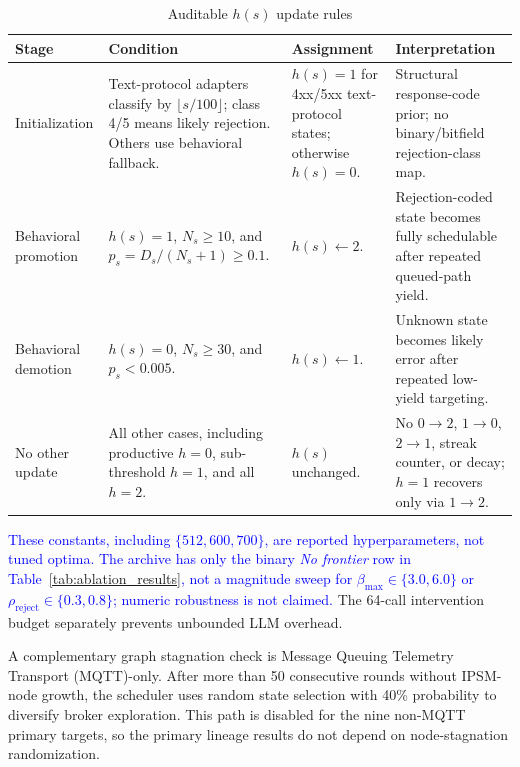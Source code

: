 \documentclass[final,5p,times,number]{elsarticle}
\begin{document}
\begin{table}[!t]
\centering
\caption{Auditable $h(s)$ update rules}
\label{tab:error_hint_update}
{\scriptsize
\setlength{\tabcolsep}{4.0pt}
\renewcommand{\arraystretch}{1.08}
\begin{tabularx}{\textwidth}{p{} p{} p{} X}
\toprule
Stage & Condition & Assignment & Interpretation \\
\midrule
Initialization &
Text-protocol adapters classify by $\lfloor s/100\rfloor$; class 4/5 means likely rejection. Others use behavioral fallback. &
$h(s)=1$ for 4xx/5xx text-protocol states; otherwise $h(s)=0$. &
Structural response-code prior; no binary/bitfield rejection-class map. \\
\midrule
Behavioral promotion &
$h(s)=1$, $N_s\ge10$, and $p_s=D_s/(N_s+1)\ge0.1$. &
$h(s)\leftarrow2$. &
Rejection-coded state becomes fully schedulable after repeated queued-path yield. \\
\midrule
Behavioral demotion &
$h(s)=0$, $N_s\ge30$, and $p_s<0.005$. &
$h(s)\leftarrow1$. &
Unknown state becomes likely error after repeated low-yield targeting. \\
\midrule
No other update &
All other cases, including productive $h=0$, sub-threshold $h=1$, and all $h=2$. &
$h(s)$ unchanged. &
No $0\!\rightarrow\!2$, $1\!\rightarrow\!0$, $2\!\rightarrow\!1$, streak counter, or decay; $h=1$ recovers only via $1\!\rightarrow\!2$. \\
\bottomrule
\end{tabularx}
}
\end{table}

\textcolor{blue}{These constants, including $\{512,600,700\}$, are reported hyperparameters, not tuned optima. The archive has only the binary \emph{No frontier} row in Table~\ref{tab:ablation_results}, not a magnitude sweep for $\beta_{\max}\in\{3.0,6.0\}$ or $\rho_{\mathrm{reject}}\in\{0.3,0.8\}$; numeric robustness is not claimed.} The 64-call intervention budget separately prevents unbounded LLM overhead.

A complementary graph stagnation check is Message Queuing Telemetry Transport (MQTT)-only. After more than 50 consecutive rounds without IPSM-node growth, the scheduler uses random state selection with 40\% probability to diversify broker exploration. This path is disabled for the nine non-MQTT primary targets, so the primary lineage results do not depend on node-stagnation randomization.
\end{document}
